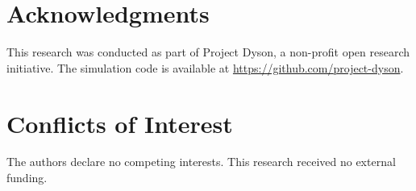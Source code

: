\documentclass[preprint,12pt]{elsarticle}
\begin{document}

\section*{Acknowledgments}

This research was conducted as part of Project Dyson, a non-profit open research initiative. The simulation code is available at \url{https://github.com/project-dyson}.

\section*{Conflicts of Interest}

The authors declare no competing interests. This research received no external funding.
\end{document}
